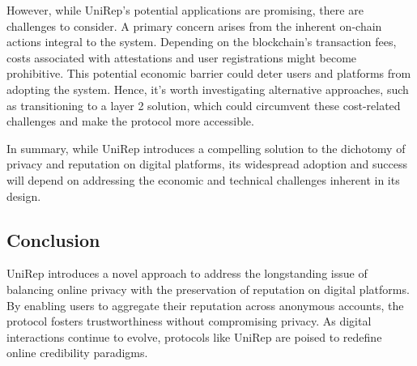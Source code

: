\documentclass[11pt]{article}
\begin{document}
However, while UniRep's potential applications are promising, there are challenges to consider. A primary concern arises from the inherent on-chain actions integral to the system. Depending on the blockchain's transaction fees, costs associated with attestations and user registrations might become prohibitive. This potential economic barrier could deter users and platforms from adopting the system. Hence, it's worth investigating alternative approaches, such as transitioning to a layer 2 solution, which could circumvent these cost-related challenges and make the protocol more accessible.

In summary, while UniRep introduces a compelling solution to the dichotomy of privacy and reputation on digital platforms, its widespread adoption and success will depend on addressing the economic and technical challenges inherent in its design.
\subsection{Conclusion}
\label{sec:orga0b6463}

UniRep introduces a novel approach to address the longstanding issue of balancing online privacy with the preservation of reputation on digital platforms. By enabling users to aggregate their reputation across anonymous accounts, the protocol fosters trustworthiness without compromising privacy. As digital interactions continue to evolve, protocols like UniRep are poised to redefine online credibility paradigms.
\end{document}
